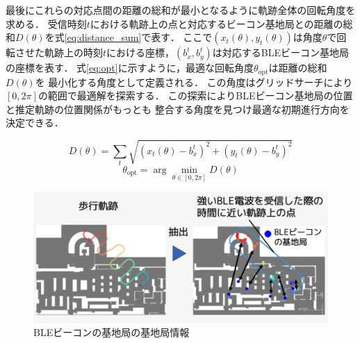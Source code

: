 最後にこれらの対応点間の距離の総和が最小となるように軌跡全体の回転角度を求める．
受信時刻$t$における軌跡上の点と対応するビーコン基地局との距離の総和$D(\theta)$を式\ref{eq:distance_sum}で表す．
ここで$(x_t(\theta), y_t(\theta))$は角度$\theta$で回転させた軌跡上の時刻$t$における座標，$(b_x^t, b_y^t)$は対応するBLEビーコン基地局の座標を表す．
式\ref{eq:opt}に示すように，最適な回転角度$\theta_{\mathrm{opt}}$は距離の総和$D(\theta)$を
最小化する角度として定義される．
この角度はグリッドサーチにより$[0, 2\pi]$の範囲で最適解を探索する．%
この探索によりBLEビーコン基地局の位置と推定軌跡の位置関係がもっとも
整合する角度を見つけ最適な初期進行方向を決定できる．

\begin{equation}
\label{eq:distance_sum}
D(\theta) = \sum_{t} \sqrt{(x_t(\theta) - b_x^t)^2 + (y_t(\theta) - b_y^t)^2}
\end{equation}
\begin{equation}
\label{eq:opt}
\theta_{\mathrm{opt}} = \arg\min_{\theta \in [0, 2\pi]} D(\theta)
\end{equation}

\begin{figure}[H]
	\centering
	\includegraphics[width=\linewidth]{../image/ble-merge.jpg}
	\caption{BLEビーコンの基地局の基地局情報}    \label{fig:ble-merge}
\end{figure}







